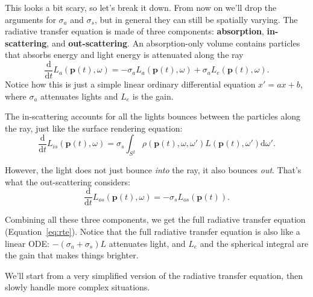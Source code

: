 This looks a bit scary, so let's break it down. From now on we'll drop the arguments for $\sigma_a$ and $\sigma_s$, but in general they can still be spatially varying. The radiative transfer equation is made of three components: \textbf{absorption}, \textbf{in-scattering}, and \textbf{out-scattering}. An absorption-only volume contains particles that absorbs energy and light energy is attenuated along the ray
\begin{equation}
\frac{\mathrm{d}}{\mathrm{d}t} L_a(\mathbf{p}(t), \omega) = -\sigma_a L_a(\mathbf{p}(t), \omega) + \sigma_a L_e(\mathbf{p}(t), \omega).
\end{equation}
Notice how this is just a simple linear ordinary differential equation $x' = ax + b$, where $\sigma_a$ attenuates lights and $L_e$ is the gain.

The in-scattering accounts for all the lights bounces between the particles along the ray, just like the surface rendering equation:
\begin{equation}
\frac{\mathrm{d}}{\mathrm{d}t} L_{is}(\mathbf{p}(t), \omega) = \sigma_s \int_{S^2} \rho(\mathbf{p}(t), \omega, \omega') L(\mathbf{p}(t), \omega') \mathrm{d}\omega'.
\end{equation}

However, the light does not just bounce \emph{into} the ray, it also bounces \emph{out}. That's what the out-scattering considers:
\begin{equation}
\frac{\mathrm{d}}{\mathrm{d}t} L_{os}(\mathbf{p}(t), \omega) = -\sigma_s L_{os}(\mathbf{p}(t)).
\end{equation}

Combining all these three components, we get the full radiative transfer equation (Equation~\ref{eq:rte}). Notice that the full radiative transfer equation is also like a linear ODE: $-(\sigma_a + \sigma_s) L$ attenuates light, and $L_e$ and the spherical integral are the gain that makes things brighter.

We'll start from a very simplified version of the radiative transfer equation, then slowly handle more complex situations.

\section{}

